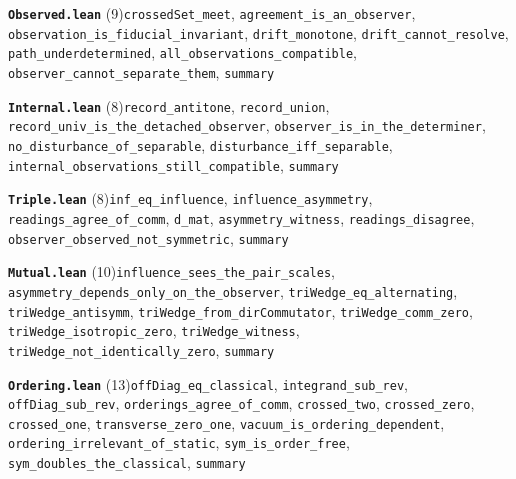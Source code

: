\documentclass[11pt,a4paper]{article}
\theoremstyle{sudef}
\begin{document}
\noindent\textbf{\texttt{Observed.lean}} (9)\quad \texttt{crossedSet\_\allowbreak meet}, \texttt{agreement\_\allowbreak is\_\allowbreak an\_\allowbreak observer}, \texttt{observation\_\allowbreak is\_\allowbreak fiducial\_\allowbreak invariant}, \texttt{drift\_\allowbreak monotone}, \texttt{drift\_\allowbreak cannot\_\allowbreak resolve}, \texttt{path\_\allowbreak underdetermined}, \texttt{all\_\allowbreak observations\_\allowbreak compatible}, \texttt{observer\_\allowbreak cannot\_\allowbreak separate\_\allowbreak them}, \texttt{summary}\par\smallskip
\noindent\textbf{\texttt{Internal.lean}} (8)\quad \texttt{record\_\allowbreak antitone}, \texttt{record\_\allowbreak union}, \texttt{record\_\allowbreak univ\_\allowbreak is\_\allowbreak the\_\allowbreak detached\_\allowbreak observer}, \texttt{observer\_\allowbreak is\_\allowbreak in\_\allowbreak the\_\allowbreak determiner}, \texttt{no\_\allowbreak disturbance\_\allowbreak of\_\allowbreak separable}, \texttt{disturbance\_\allowbreak iff\_\allowbreak separable}, \texttt{internal\_\allowbreak observations\_\allowbreak still\_\allowbreak compatible}, \texttt{summary}\par\smallskip
\noindent\textbf{\texttt{Triple.lean}} (8)\quad \texttt{inf\_\allowbreak eq\_\allowbreak influence}, \texttt{influence\_\allowbreak asymmetry}, \texttt{readings\_\allowbreak agree\_\allowbreak of\_\allowbreak comm}, \texttt{d\_\allowbreak mat}, \texttt{asymmetry\_\allowbreak witness}, \texttt{readings\_\allowbreak disagree}, \texttt{observer\_\allowbreak observed\_\allowbreak not\_\allowbreak symmetric}, \texttt{summary}\par\smallskip
\noindent\textbf{\texttt{Mutual.lean}} (10)\quad \texttt{influence\_\allowbreak sees\_\allowbreak the\_\allowbreak pair\_\allowbreak scales}, \texttt{asymmetry\_\allowbreak depends\_\allowbreak only\_\allowbreak on\_\allowbreak the\_\allowbreak observer}, \texttt{triWedge\_\allowbreak eq\_\allowbreak alternating}, \texttt{triWedge\_\allowbreak antisymm}, \texttt{triWedge\_\allowbreak from\_\allowbreak dirCommutator}, \texttt{triWedge\_\allowbreak comm\_\allowbreak zero}, \texttt{triWedge\_\allowbreak isotropic\_\allowbreak zero}, \texttt{triWedge\_\allowbreak witness}, \texttt{triWedge\_\allowbreak not\_\allowbreak identically\_\allowbreak zero}, \texttt{summary}\par\smallskip
\noindent\textbf{\texttt{Ordering.lean}} (13)\quad \texttt{offDiag\_\allowbreak eq\_\allowbreak classical}, \texttt{integrand\_\allowbreak sub\_\allowbreak rev}, \texttt{offDiag\_\allowbreak sub\_\allowbreak rev}, \texttt{orderings\_\allowbreak agree\_\allowbreak of\_\allowbreak comm}, \texttt{crossed\_\allowbreak two}, \texttt{crossed\_\allowbreak zero}, \texttt{crossed\_\allowbreak one}, \texttt{transverse\_\allowbreak zero\_\allowbreak one}, \texttt{vacuum\_\allowbreak is\_\allowbreak ordering\_\allowbreak dependent}, \texttt{ordering\_\allowbreak irrelevant\_\allowbreak of\_\allowbreak static}, \texttt{sym\_\allowbreak is\_\allowbreak order\_\allowbreak free}, \texttt{sym\_\allowbreak doubles\_\allowbreak the\_\allowbreak classical}, \texttt{summary}\par\smallskip
\end{document}
